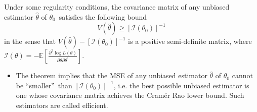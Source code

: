\documentclass[notes=show]{beamer}
\begin{document}
\begin{frame}%


\begin{theorem}
Under some regularity conditions, the covariance matrix of any unbiased
estimator $\hat{\theta}$ of $\theta _{0}$\ satisfies the following bound%
\begin{equation*}
V\left( \hat{\theta}\right) \geq \left[ \mathcal{I}\left( \theta _{0}\right) %
\right] ^{-1}
\end{equation*}%
in the sense that $V\left( \hat{\theta}\right) -\left[ \mathcal{I}\left(
\theta _{0}\right) \right] ^{-1}$ is a positive semi-definite matrix, where $%
\mathcal{I}\left( \theta \right) =-\mathbb{E}\left[ \frac{\partial ^{2}\log
L(\theta )}{\partial \theta \partial \theta ^{\prime }}\right] .$
\end{theorem}

\begin{itemize}
\item The theorem implies that the MSE of any unbiased estimator $\hat{\theta%
}$ of $\theta _{0}$ cannot be \textquotedblleft smaller\textquotedblright\
than $\left[ \mathcal{I}\left( \theta _{0}\right) \right] ^{-1}$, i.e. the
best possible unbiased estimator is one whose covariance matrix achieves the
Cram\'{e}r Rao lower bound. Such estimators are called efficient.
\end{itemize}

\end{frame}%
\end{document}
